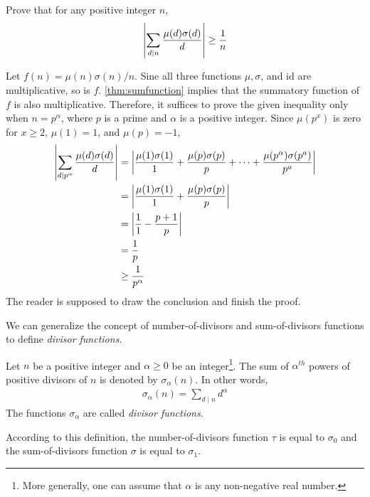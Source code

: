 \begin{problem}
	Prove that for any positive integer $n$,
		\begin{align*}
			\left\lvert\sum_{d\mid n}\frac{\mu(d)\sigma(d)}{d}\right\rvert \geq \frac{1}{n}
		\end{align*}
\end{problem}

\begin{solution}
	Let $f(n)=\mu(n)\sigma(n)/n$. Sine all three functions $\mu, \sigma$, and $\text{id}$ are multiplicative, so is $f$. \autoref{thm:sumfunction} implies that the summatory function of $f$ is also multiplicative. Therefore, it suffices to prove the given inequality only when $n=p^\alpha$, where $p$ is a prime and $\alpha$ is a positive integer. Since $\mu(p^x)$ is zero for $x \geq 2$, $\mu(1)=1$, and $\mu(p)=-1$,
		\begin{align*}
			\left\lvert\sum_{d\mid p^\alpha}\frac{\mu(d)\sigma(d)}{d}\right\rvert
					&= \left\lvert\frac{\mu(1)\sigma(1)}{1} + \frac{\mu(p)\sigma(p)}{p} + \cdots + \frac{\mu(p^\alpha)\sigma(p^a)}{p^a}\right\rvert\\
					&= \left\lvert\frac{\mu(1)\sigma(1)}{1} + \frac{\mu(p)\sigma(p)}{p}\right\rvert\\
					&= \left\lvert\frac{1}{1} - \frac{p+1}{p}\right\rvert\\
					&= \frac{1}{p}\\
					&\geq \frac{1}{p^\alpha}
		\end{align*}
	The reader is supposed to draw the conclusion and finish the proof.
\end{solution}
We can generalize the concept of number-of-divisors and sum-of-divisors functions to define \textit{divisor functions}.
\begin{definition}
	Let $n$ be a positive integer and $\alpha \geq 0$ be an integer\footnote{More generally, one can assume that $\alpha$ is any non-negative real number.}. The sum of $\alpha^{th}$ powers of positive divisors of $n$ is denoted by $\sigma_\alpha(n)$. In other words,
		\begin{align*}
			\sigma_\alpha(n) = \sum_{d\mid n} d^\alpha
		\end{align*}
	The functions $\sigma_\alpha$ are called \textit{divisor functions}.
\end{definition}
According to this definition, the number-of-divisors function $\tau$ is equal to $\sigma_0$ and the sum-of-divisors function $\sigma$ is equal to $\sigma_1$.
